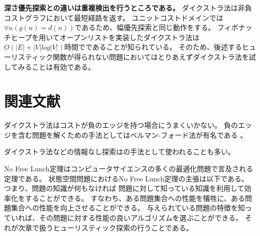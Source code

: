{\bf 深さ優先探索との違いは重複検出を行うところである。}
ダイクストラ法は非負コストグラフにおいて最短経路を返す。
ユニットコストドメインでは$\forall n (g(n) = d(n))$であるため、幅優先探索と同じ動作をする。
フィボナッチヒープを用いてオープンリストを実装したダイクストラ法は$O(|E| + |V|log|V|)$時間でであることが知られている\cite{fredman1987fibonacci}。%
そのため、後述するヒューリスティック関数が得られない問題においてはとりあえずダイクストラ法を試してみることは有効である。






\section{関連文献}

ダイクストラ法はコストが負のエッジを持つ場合にうまくいかない。
負のエッジを含む問題を解くための手法としてはベルマン-フォード法が有名である \cite{bellman1958routing,ford1956network}。


ダイクストラ法などの情報なし探索はの手法として使われることも多い\cite{tarjan1983data}。

No Free Lunch定理\cite{wolpert1997no}はコンピュータサイエンスの多くの最適化問題で言及される定理である。
状態空間問題におけるNo Free Lunch定理の主張は以下である。
つまり、問題の知識が何もなければ
問題に対して知っている知識を利用して効率化をすることができる。
すなわち、ある問題集合への性能を犠牲に、ある問題集合への性能を向上させることができる。
与えられている問題の特徴を知っていれば、その問題に対する性能の良いアルゴリズムを選ぶことができる。
それが次章で扱うヒューリスティック探索の行うことである。


